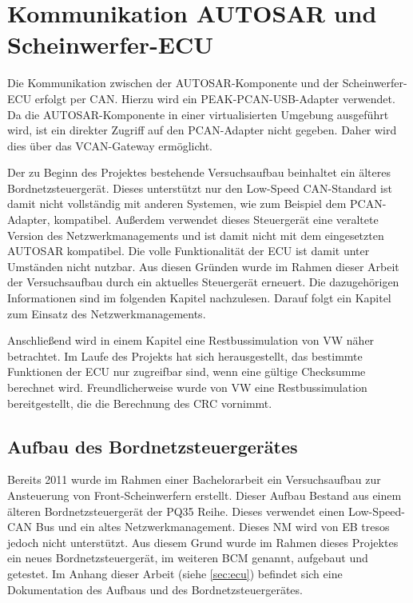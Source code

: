\documentclass[
  a4paper,					    %
  twoside,
  DIV=calc,     				%
  bibliography=totoc,
  cleardoublepage=empty,
  ngerman,     					%
  final       					%
]{scrbook}
\begin{document}
\section{Kommunikation AUTOSAR und Scheinwerfer-ECU}
\label{sec:Kommunikation_A_S}
Die Kommunikation zwischen der AUTOSAR-Komponente und der Scheinwerfer-ECU erfolgt per CAN. Hierzu wird ein PEAK-PCAN-USB-Adapter verwendet. Da die AUTOSAR-Komponente in einer virtualisierten Umgebung ausgeführt wird, ist ein direkter Zugriff auf den PCAN-Adapter nicht gegeben. Daher wird dies über das VCAN-Gateway ermöglicht.

Der zu Beginn des Projektes bestehende Versuchsaufbau beinhaltet ein älteres Bordnetzsteuergerät. Dieses unterstützt nur den Low-Speed CAN-Standard ist damit nicht vollständig mit anderen Systemen, wie zum Beispiel dem PCAN-Adapter, kompatibel. Außerdem verwendet dieses Steuergerät eine veraltete Version des Netzwerkmanagements und ist damit nicht mit dem eingesetzten AUTOSAR kompatibel. Die volle Funktionalität der ECU ist damit unter Umständen nicht nutzbar. Aus diesen Gründen wurde im Rahmen dieser Arbeit der Versuchsaufbau durch ein aktuelles Steuergerät erneuert. Die dazugehörigen Informationen sind im folgenden Kapitel nachzulesen. Darauf folgt ein Kapitel zum Einsatz des Netzwerkmanagements.

Anschließend wird in einem Kapitel eine Restbussimulation von VW näher betrachtet. Im Laufe des Projekts hat sich herausgestellt, das bestimmte Funktionen der ECU nur zugreifbar sind, wenn eine gültige Checksumme berechnet wird. Freundlicherweise wurde von VW eine Restbussimulation bereitgestellt, die die Berechnung des CRC vornimmt.




\subsection{Aufbau des Bordnetzsteuergerätes}
\label{sec:Aufbau_der_ECU}
Bereits 2011 wurde im Rahmen einer Bachelorarbeit ein Versuchsaufbau zur Ansteuerung von Front-Scheinwerfern erstellt. Dieser Aufbau Bestand aus einem älteren Bordnetzsteuergerät der PQ35 Reihe. Dieses verwendet einen Low-Speed-CAN Bus und ein altes Netzwerkmanagement. Dieses NM wird von EB tresos jedoch nicht unterstützt. Aus diesem Grund wurde im Rahmen dieses Projektes ein neues Bordnetzsteuergerät, im weiteren BCM genannt, aufgebaut und getestet. Im Anhang dieser Arbeit (siehe \ref{sec:ecu}) befindet sich eine Dokumentation des Aufbaus und des Bordnetzsteuergerätes.
\end{document}
